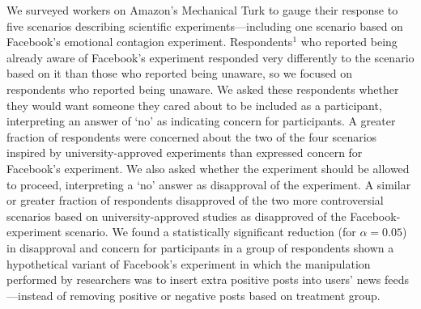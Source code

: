We surveyed  workers on Amazon's Mechanical Turk to gauge their response to five scenarios describing scientific experiments---including one scenario based on Facebook's emotional contagion experiment.  Respondents$^{1}$ who reported being already aware of Facebook's experiment responded very differently to the scenario based on it than those who reported being unaware, so we focused on  respondents who reported being unaware.  We asked these respondents whether they would want someone they cared about to be included as a participant, interpreting an answer of `no' as indicating concern for participants.  A greater fraction of respondents were concerned about the two of the four scenarios inspired by university-approved experiments than expressed concern for Facebook's experiment.  We also asked whether the experiment should be allowed to proceed, interpreting a `no' answer as disapproval of the experiment.  A similar or greater fraction of respondents disapproved of the two more controversial scenarios based on university-approved studies as disapproved of the Facebook-experiment scenario.  We found a statistically significant reduction (for $\alpha=0.05$) in disapproval and concern for participants in a group of respondents shown a hypothetical variant of Facebook's experiment in which the manipulation performed by researchers was to insert extra positive posts into users' news feeds---instead of removing positive or negative posts based on treatment group. 